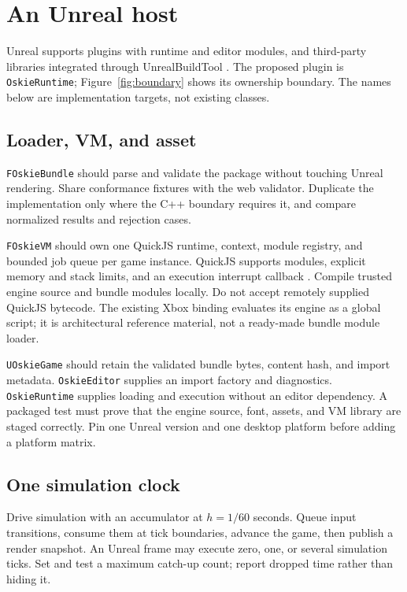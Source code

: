 \documentclass[10pt,letterpaper,twocolumn]{article}
\newcommand{\code}[1]{\texttt{\nolinkurl{#1}}}
\begin{document}
\section{An Unreal host}\label{sec:host}
Unreal supports plugins with runtime and editor modules, and third-party libraries integrated through UnrealBuildTool \citep{plugins,thirdparty}. The proposed plugin is \code{OskieRuntime}; Figure~\ref{fig:boundary} shows its ownership boundary. The names below are implementation targets, not existing classes.



\subsection{Loader, VM, and asset}
\code{FOskieBundle} should parse and validate the package without touching Unreal rendering. Share conformance fixtures with the web validator. Duplicate the implementation only where the C++ boundary requires it, and compare normalized results and rejection cases.

\code{FOskieVM} should own one QuickJS runtime, context, module registry, and bounded job queue per game instance. QuickJS supports modules, explicit memory and stack limits, and an execution interrupt callback \citep{quickjs}. Compile trusted engine source and bundle modules locally. Do not accept remotely supplied QuickJS bytecode. The existing Xbox binding evaluates its engine as a global script; it is architectural reference material, not a ready-made bundle module loader.

\code{UOskieGame} should retain the validated bundle bytes, content hash, and import metadata. \code{OskieEditor} supplies an import factory and diagnostics. \code{OskieRuntime} supplies loading and execution without an editor dependency. A packaged test must prove that the engine source, font, assets, and VM library are staged correctly. Pin one Unreal version and one desktop platform before adding a platform matrix.

\subsection{One simulation clock}
Drive simulation with an accumulator at $h=1/60$ seconds. Queue input transitions, consume them at tick boundaries, advance the game, then publish a render snapshot. An Unreal frame may execute zero, one, or several simulation ticks. Set and test a maximum catch-up count; report dropped time rather than hiding it.
\end{document}
